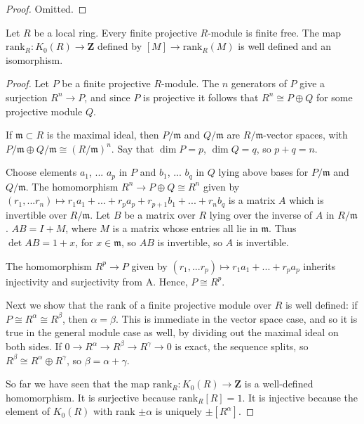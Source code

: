 \begin{proof}
Omitted.
\end{proof}

\begin{lemma}
\label{lemma-K0-local}
Let $R$ be a local ring. Every finite projective $R$-module
is finite free. The map $\text{rank}_R : K_0(R) \to \mathbf{Z}$
defined by $[M] \to \text{rank}_R(M)$ is well defined
and an isomorphism.
\end{lemma}

\begin{proof}
Let $P$ be a finite projective $R$-module.
The $n$ generators of $P$ give a surjection
$R^n \to P$, and since $P$ is projective it
follows that $R^n \cong P \oplus Q$ for some
projective module $Q$. 

\medskip\noindent
If $\mathfrak m \subset R$ is the maximal ideal,
then $P/\mathfrak m$ and $Q/\mathfrak m$ are $R/\mathfrak m$-vector spaces,
with $P/\mathfrak m \oplus Q/\mathfrak m \cong (R/\mathfrak m)^n$.
Say that $\dim P = p$, $\dim Q = q$, so $p+q=n$. 

\medskip\noindent
Choose elements $a_1$, ... $a_p$ in $P$ and $b_1$, ... $b_q$ in $Q$
lying above bases for $P/\mathfrak m$ and $Q/\mathfrak m$.
The homomorphism $R^n \to P \oplus Q \cong R^n$ given by 
$(r_1, ... r_n) \mapsto r_1a_1+...+r_pa_p+r_{p+1} b_1+...+r_nb_q$
is a matrix $A$ which is invertible over $R/\mathfrak m$. Let $B$
be a matrix over $R$ lying over the inverse of $A$ in $R/\mathfrak m$.
$AB = I+M$, where $M$ is a matrix whose entries all lie in $\mathfrak m$.
Thus $\det AB = 1+x$, for $x \in \mathfrak m$, so $AB$ is invertible,
so $A$ is invertible. 

\medskip\noindent
The homomorphism $R^p \to P$ given by
$(r_1, ... r_p) \mapsto r_1a_1+...+r_pa_p$ inherits injectivity and
surjectivity from A. Hence, $P \cong R^p$.

\medskip\noindent
Next we show that the rank of a finite projective module over $R$ is
well defined: if $P \cong R^\alpha \cong R^\beta$, then $\alpha = \beta$.
This is immediate in the vector space case, and so it is true in the
general module case as well, by dividing out the maximal ideal on both sides.
If $0 \to R^\alpha \to R^\beta \to R^\gamma \to 0$
is exact, the sequence splits, so $R^\beta \cong R^\alpha \oplus R^\gamma$,
so $\beta = \alpha+\gamma$.

\medskip\noindent
So far we have seen that the map $\text{rank}_R : K_0(R) \to \mathbf{Z}$
is a well-defined homomorphism. It is surjective because
$\text{rank}_R[R] = 1$. It is injective because the element
of $K_0(R)$ with rank $\pm\alpha$ is uniquely $\pm[R^\alpha]$.
\end{proof}

